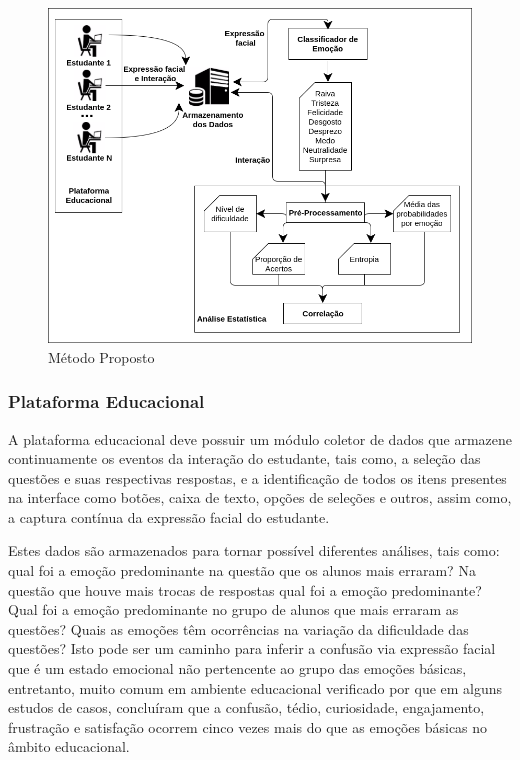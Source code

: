 \begin{figure}
\centering
\includegraphics[scale=0.5]{figuras/diagrama.png}
\caption{Método Proposto}
\label{fig:metproposto}
\end{figure}

\subsubsection{Plataforma Educacional}
A plataforma educacional deve possuir um módulo coletor de dados que armazene continuamente os eventos da interação do estudante, tais como, a seleção das questões e suas respectivas respostas, e a identificação de todos os itens presentes na interface como botões, caixa de texto, opções de seleções e outros, assim como, a captura contínua da expressão facial do estudante.

Estes dados são armazenados para tornar possível diferentes análises, tais como: qual foi a emoção predominante na questão que os alunos mais erraram? Na questão que houve mais trocas de respostas qual foi a emoção predominante? Qual foi a emoção predominante no grupo de alunos que mais erraram as questões? Quais as emoções têm ocorrências na variação da dificuldade das questões? Isto pode ser um caminho para inferir a confusão via expressão facial que é um estado emocional não pertencente ao grupo das emoções básicas, entretanto, muito comum em ambiente educacional verificado por \cite{d2013beyond} que em alguns estudos de casos, concluíram que a confusão, tédio, curiosidade, engajamento, frustração e satisfação ocorrem cinco vezes mais do que as emoções básicas no âmbito educacional.

